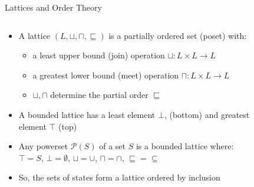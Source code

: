 \documentclass[aspectratio=169,notes]{beamer}
\begin{document}
\begingroup
\small
\begin{frame}{Lattices and Order Theory}
  \begin{columns}[T]
  \begin{column}{0.6\textwidth}
  \begin{itemize}
  \item A lattice $(L, \sqcup, \sqcap, \sqsubseteq)$ is a partially ordered set (poset) with:
    \begin{itemize}\footnotesize
    \item a least upper bound (join) operation $\sqcup: L \times L \to L$
    \item a greatest lower bound (meet) operation $\sqcap: L \times L \to L$
    \item $\sqcup, \sqcap$ determine the partial order $\sqsubseteq$
    \end{itemize}
  \item<9-> A bounded lattice has a least element $\bot$, (bottom)
    and greatest element $\top$ (top)
  \item<10-> Any powerset $\mathcal{P}(S)$ of a set $S$ is a bounded lattice where:
     $\top = S$,
     $\bot = \emptyset$,
     $\sqcup = \cup$,
     $\sqcap = \cap$,
     $\sqsubseteq = \subseteq$
   \item<11-> So, the sets of states form a lattice ordered by inclusion
  \end{itemize}
  \end{column}
  \begin{column}{0.4\textwidth}
    \begin{figure}[h]
    \centering

\end{figure}
\end{column}
\end{columns}
\end{frame}
\end{document}
